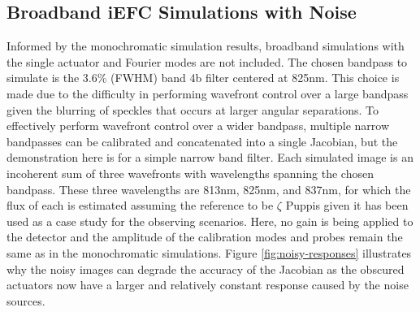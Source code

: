 \documentclass[12pt]{spieman}  %
\begin{document}
\begin{spacing}{2}
\section{Broadband iEFC Simulations with Noise}
\label{sec:bb-iefc}
Informed by the monochromatic simulation results, broadband simulations with the single actuator and Fourier modes are not included. The chosen bandpass to simulate is the 3.6\% (FWHM) band 4b filter centered at 825nm\cite{krists-bible}. This choice is made due to the difficulty in performing wavefront control over a large bandpass given the blurring of speckles that occurs at larger angular separations. To effectively perform wavefront control over a wider bandpass, multiple narrow bandpasses can be calibrated and concatenated into a single Jacobian\cite{haffert-iefc}, but the demonstration here is for a simple narrow band filter. Each simulated image is an incoherent sum of three wavefronts with wavelengths spanning the chosen bandpass. These three wavelengths are 813nm, 825nm, and 837nm, for which the flux of each is estimated assuming the reference to be $\zeta$ Puppis given it has been used as a case study for the observing scenarios. Here, no gain is being applied to the detector and the amplitude of the calibration modes and probes remain the same as in the monochromatic simulations. Figure \ref{fig:noisy-responses} illustrates why the noisy images can degrade the accuracy of the Jacobian as the obscured actuators now have a larger and relatively constant response caused by the noise sources.


\end{spacing}
\end{document}
